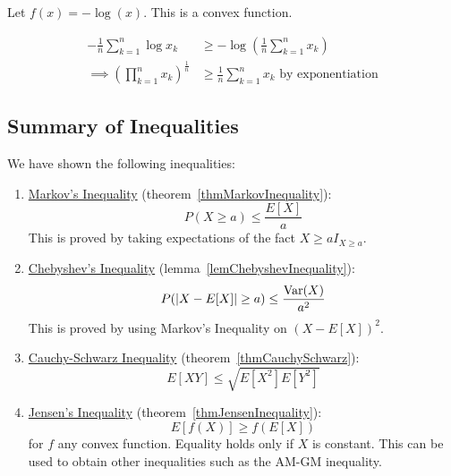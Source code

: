\documentclass[../Main.tex]{subfiles}
\begin{document}
\begin{corollary}[AM-GM Inequality]
    Let $f(x) = -\log{(x)}$. This is a convex function.\par
    \begin{align*}
        -\frac{1}{n} \sum_{k=1}^n \log{x_k} & \geq -\log{(\frac{1}{n}\sum_{k=1}^n x_k)} \\
       \implies \left(\prod_{k=1}^n x_k\right)^{\frac{1}{n}} &\geq \frac{1}{n} \sum_{k=1}^n x_k \text{ by exponentiation}
    \end{align*}
    \label{corAMGM}
\end{corollary}
\subsection{Summary of Inequalities}
We have shown the following inequalities:
\begin{enumerate}
    \item \underline{Markov's Inequality} (theorem~\ref{thmMarkovInequality}):
        \begin{equation*}
            P(X \geq a) \leq \frac{E[X]}{a}
        \end{equation*}
        This is proved by taking expectations of the fact $X \geq aI_{X \geq a}$.
    \item \underline{Chebyshev's Inequality} (lemma~\ref{lemChebyshevInequality}):
        \begin{equation*}
            P(|X - E[X]| \geq a) \leq \frac{\operatorname{Var}(X)}{a^2}
        \end{equation*}
        This is proved by using Markov's Inequality on $(X - E[X])^2$.
    \item \underline{Cauchy-Schwarz Inequality} (theorem~\ref{thmCauchySchwarz}):
        \begin{equation*}
            E[XY] \leq \sqrt{E[X^2] E[Y^2]}
        \end{equation*}
    \item \underline{Jensen's Inequality} (theorem~\ref{thmJensenInequality}):
        \begin{equation*}
            E[f(X)] \geq f(E[X])
        \end{equation*}
        for $f$ any convex function. Equality holds only if $X$ is constant. This can be used to obtain other inequalities such as the AM-GM inequality.
\end{enumerate}
\end{document}
